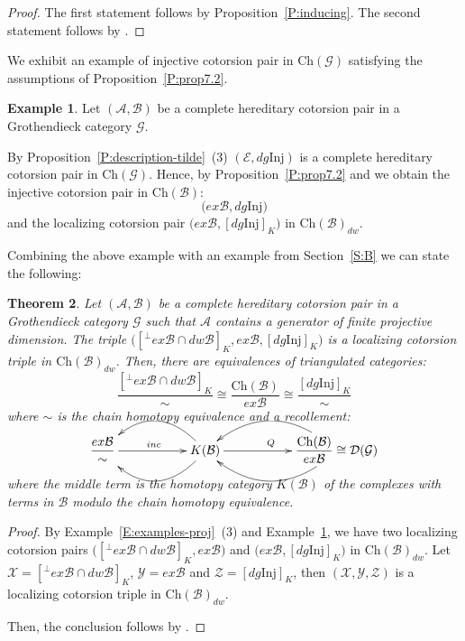 \documentclass[11pt,a4paper,reqno]{amsart}
\newcommand{\A}{\mathcal{A}}
\newcommand{\B}{\mathcal{B}}
\newcommand{\D}{\mathcal{D}}
\newcommand{\E}{\mathcal{E}}
\newcommand{\G}{\mathcal{G}}
\newcommand{\X}{\mathcal{X}}
\newcommand{\Y}{\mathcal{Y}}
\newcommand{\Z}{\mathcal{Z}}
\newcommand{\Ch}{\mathrm{Ch}}
\newcommand{\Inj}{\mathrm{Inj}}
\theoremstyle{plain}
\newtheorem{thm}{Theorem}[section]
\theoremstyle{definition}
\newtheorem{expl}[thm]{Example}
\theoremstyle{remark}
\begin{document}
%
\begin{proof} The first statement follows by Proposition~\ref{P:inducing}. The second statement follows by \cite[Theorem 6.3]{G7}.
\end{proof}


%

We exhibit an example of injective cotorsion pair in $\Ch(\G)$ satisfying the assumptions of Proposition~\ref{P:prop7.2}.

 \begin{expl}\label{E:examples-inj} Let $(\A, \B)$ be a complete hereditary cotorsion pair in a Grothendieck  category $\G$.

By Proposition~\ref{P:description-tilde}~(3) $(\E, dg\Inj)$ is a complete hereditary cotorsion pair in $\Ch(\G)$.
 Hence, by Proposition~\ref{P:prop7.2} and \cite[Theorem 6.3]{G7} we obtain the injective cotorsion pair in $\Ch(\B)$:
 \[\Big(ex\B,dg \Inj\Big)\] and the localizing cotorsion pair $\Big(ex\B, [dg \Inj]_K\Big)$ in $\Ch(\B)_{dw}.$

\end{expl}


Combining the above example with an example from Section~\ref{S:B} we can state the following:
\begin{thm}\label{T:triple-B}  Let $(\A, \B)$ be a complete hereditary cotorsion pair in a  Grothendieck category $\G$ such that $\A$ contains a generator of finite projective dimension.
The triple $\Big([{}^\perp{} ex\B\cap dw \B]_K, ex\B, [dg \Inj]_K\Big)$ is a localizing cotorsion triple in $\Ch(\B)_{dw}$. Then, there are equivalences of triangulated categories:
\[\frac{[{}^\perp{} ex\B\cap dw \B]_K}{\sim} \cong \frac{\Ch(\B)}{ex\B} \cong  \frac{[dg \Inj]_K}{\sim}\]
where $\sim$ is the chain homotopy equivalence
and a recollement:
\vskip0.7cm
\[
\xymatrix{\dfrac{ex\B}{\sim} \ar[rr]^{inc} &&{K(\B)} \ar@/^2pc/[ll]\ar@/_2pc/[ll] \ar[rr]^{Q}
                                           &&{\dfrac{\Ch(\B)}{ex\B }\cong \D(\G)}\ar@/^2pc/ [ll] \ar@/_2pc/ [ll] }
\]
\vskip0.7cm
where the middle term is  the homotopy category $K(\B)$ of the complexes with terms in $\B$ modulo the chain homotopy equivalence.

\end{thm}
%
\begin{proof} By Example~\ref{E:examples-proj}~(3)  and Example~\ref{E:examples-inj}, we have two localizing cotorsion pairs $\Big([{}^\perp{} ex\B\cap dw \B]_K, ex\B\Big)$ and $\Big(ex\B,  [dg \Inj]_K\Big)$ in $\Ch(\B)_{dw}$. Let $\X=[{}^\perp{} ex\B\cap dw \B]_K$, $\Y=ex\B$ and $\Z=[dg \Inj]_K$, then $(\X, \Y, \Z)$ is a localizing cotorsion triple in $\Ch(\B)_{dw}$.

Then, the conclusion follows by  \cite[Corollary 4.5]{G7} .
\end{proof}
\end{document}
